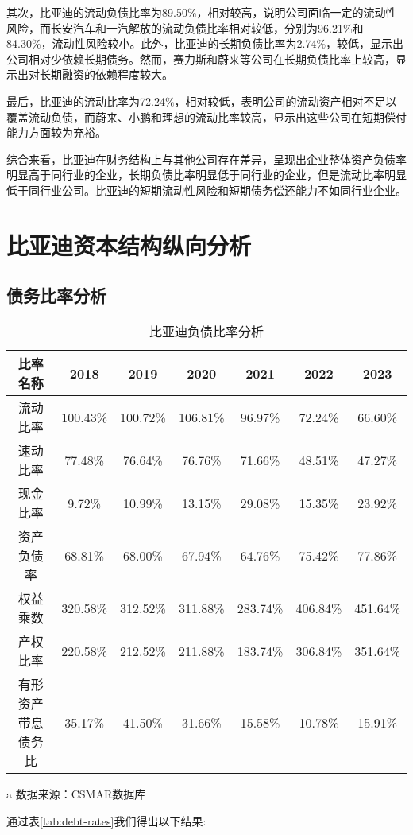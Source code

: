 其次，比亚迪的流动负债比率为89.50\%，相对较高，说明公司面临一定的流动性风险，而长安汽车和一汽解放的流动负债比率相对较低，分别为96.21\%和84.30\%，流动性风险较小。此外，比亚迪的长期负债比率为2.74\%，较低，显示出公司相对少依赖长期债务。然而，赛力斯和蔚来等公司在长期负债比率上较高，显示出对长期融资的依赖程度较大。

最后，比亚迪的流动比率为72.24\%，相对较低，表明公司的流动资产相对不足以覆盖流动负债，而蔚来、小鹏和理想的流动比率较高，显示出这些公司在短期偿付能力方面较为充裕。

综合来看，比亚迪在财务结构上与其他公司存在差异，呈现出企业整体资产负债率明显高于同行业的企业，长期负债比率明显低于同行业的企业，但是流动比率明显低于同行业公司。比亚迪的短期流动性风险和短期债务偿还能力不如同行业企业。
\section{比亚迪资本结构纵向分析}
\subsection{债务比率分析}
\begin{table}
  \centering
  \begin{threeparttable}[c]
    \caption{比亚迪负债比率分析}
    \label{tab:debt-rates}
    \begin{tabular}{ccccccc}
      \toprule
        比率名称 & 2018 & 2019 & 2020 & 2021 & 2022 & 2023 \\ 
      \midrule
        流动比率 & 100.43\% & 100.72\% & 106.81\% & 96.97\% & 72.24\% & 66.60\% \\ 
        速动比率 & 77.48\% & 76.64\% & 76.76\% & 71.66\% & 48.51\% & 47.27\% \\ 
        现金比率 & 9.72\% & 10.99\% & 13.15\% & 29.08\% & 15.35\% & 23.92\% \\ 
        资产负债率 & 68.81\% & 68.00\% & 67.94\% & 64.76\% & 75.42\% & 77.86\% \\
        权益乘数 & 320.58\% & 312.52\% & 311.88\% & 283.74\% & 406.84\% & 451.64\% \\ 
        产权比率 & 220.58\% & 212.52\% & 211.88\% & 183.74\% & 306.84\% & 351.64\% \\ 
        有形资产带息债务比 & 35.17\% & 41.50\% & 31.66\% & 15.58\% & 10.78\% & 15.91\% \\ 
      \bottomrule
    \end{tabular}
    \begin{tablenotes}
      \item [a] 数据来源：CSMAR数据库
    \end{tablenotes}
  \end{threeparttable}
\end{table}
通过表\eqref{tab:debt-rates}我们得出以下结果:

